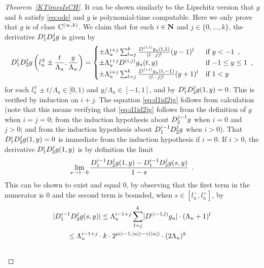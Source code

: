 \begin{proof}[Theorem~\ref{KTimesIsCH}]
It can be shown similarly to the Lipschitz version 
\cite[Theorem 3.2]{kawamura2010lipschitz}
that $g$ and $h$ satisfy \eqref{eq:ode} and $g$ is polynomial-time computable.
Here we only prove that $g$ is of class $\mathrm C^{(\infty, k)}$.
We claim that 
for each $i \in \mathbf N$ and $j \in \{0, \dots, k\}$, 
the derivative $D _1 ^i D _2 ^j g$ is given by 
\begin{equation}
   D_1^i D_2^j g \left(l^\mp_u \pm \frac{t}{\Lambda_u}, \frac{y}{\Lambda_u}\right)
   = \begin{cases}
      \pm \Lambda_u^{i+j} \sum^{k}_{l=j} \frac{D^{(i,l)} g_u(t,1)}{(l-j)!}
      (y - 1)^l &  \text{if } y < -1 \enspace ,
      \\
      \pm \Lambda_u^{i+j} D^{(i, j)} g_u(t, y) & \text{if } {-1} \le y \le 1 \enspace ,
      \\
      \pm \Lambda_u^{i+j} \sum^{k}_{l=j} 
      \frac{D^{(i,l)} g_u(t, -1)}{(l-j)!} (y + 1)^l &  \text{if } 1<y
    \end{cases}  \label{eq:d1id2jg}
\end{equation}
for each $l_u^\mp \pm t/\Lambda_u \in [0,1)$ and $y/\Lambda_u \in [-1, 1]$, 
and by $D _1 ^i D _2 ^j g (1, y) = 0$. 
This is verified by induction on $i + j$. 
The equation \eqref{eq:d1id2jg} follows from calculation 
(note that this means verifying 
that \eqref{eq:d1id2jg} follows from the definition of $g$ when $i = j = 0$; 
from the induction hypothesis about $D _2 ^{j - 1} g$ when $i = 0$ and $j > 0$; 
and from the induction hypothesis about $D _1 ^{i - 1} D _2 ^j g$ when $i > 0$).
That $D _1 ^i D _2 ^j g (1, y) = 0$ is 
immediate from the induction hypothesis if $i = 0$. 
If $i > 0$, the derivative
$D_1^i D_2^j g (1, y)$ is by definition the limit 
\begin{equation}
\lim_{s \to 1 - 0} \frac{D_1^{i-1} D_2^j g(1, y) - D_1^{i-1} D_2^j g (s, y)}{1 - s} \enspace .
\label{eq:limitofderivative}
\end{equation}
This can be shown to exist and equal $0$, 
by observing that the first term in the numerator is $0$
and the second term is bounded, when $s \in [l ^- _u, l ^+ _u]$, by 
 \begin{align}
&
  \lvert
   \D_1^{i-1} \D_2^j g (s, y)
  \rvert
  \le 
  \Lambda_u^{i-1+j} \sum^{k}_{l=j} \lvert \D^{(i-1,l)} g_u \rvert \cdot (\Lambda_u + 1)^l 
  \notag
\\
& \qquad
 \le
  \Lambda_u^{i-1+j}  \cdot k \cdot 2^{\mu(i-1, |u|) - \gamma(|u|)} \cdot (2\Lambda_u)^k
  \notag
\\
& \qquad

\end{align}
\end{proof}
